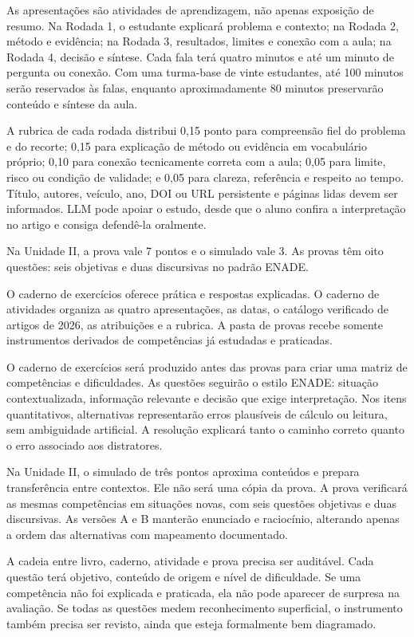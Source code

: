 As apresentações são atividades de aprendizagem, não apenas exposição de resumo. Na Rodada 1, o estudante explicará problema e contexto; na Rodada 2, método e evidência; na Rodada 3, resultados, limites e conexão com a aula; na Rodada 4, decisão e síntese. Cada fala terá quatro minutos e até um minuto de pergunta ou conexão. Com uma turma-base de vinte estudantes, até 100 minutos serão reservados às falas, enquanto aproximadamente 80 minutos preservarão conteúdo e síntese da aula.

A rubrica de cada rodada distribui 0,15 ponto para compreensão fiel do problema e do recorte; 0,15 para explicação de método ou evidência em vocabulário próprio; 0,10 para conexão tecnicamente correta com a aula; 0,05 para limite, risco ou condição de validade; e 0,05 para clareza, referência e respeito ao tempo. Título, autores, veículo, ano, DOI ou URL persistente e páginas lidas devem ser informados. LLM pode apoiar o estudo, desde que o aluno confira a interpretação no artigo e consiga defendê-la oralmente.

Na Unidade II, a prova vale 7 pontos e o simulado vale 3. As provas têm oito questões: seis objetivas e duas discursivas no padrão ENADE.

O caderno de exercícios oferece prática e respostas explicadas. O caderno de atividades organiza as quatro apresentações, as datas, o catálogo verificado de artigos de 2026, as atribuições e a rubrica. A pasta de provas recebe somente instrumentos derivados de competências já estudadas e praticadas.

O caderno de exercícios será produzido antes das provas para criar uma matriz de competências e dificuldades. As questões seguirão o estilo ENADE: situação contextualizada, informação relevante e decisão que exige interpretação. Nos itens quantitativos, alternativas representarão erros plausíveis de cálculo ou leitura, sem ambiguidade artificial. A resolução explicará tanto o caminho correto quanto o erro associado aos distratores.

Na Unidade II, o simulado de três pontos aproxima conteúdos e prepara transferência entre contextos. Ele não será uma cópia da prova. A prova verificará as mesmas competências em situações novas, com seis questões objetivas e duas discursivas. As versões A e B manterão enunciado e raciocínio, alterando apenas a ordem das alternativas com mapeamento documentado.

A cadeia entre livro, caderno, atividade e prova precisa ser auditável. Cada questão terá objetivo, conteúdo de origem e nível de dificuldade. Se uma competência não foi explicada e praticada, ela não pode aparecer de surpresa na avaliação. Se todas as questões medem reconhecimento superficial, o instrumento também precisa ser revisto, ainda que esteja formalmente bem diagramado.

